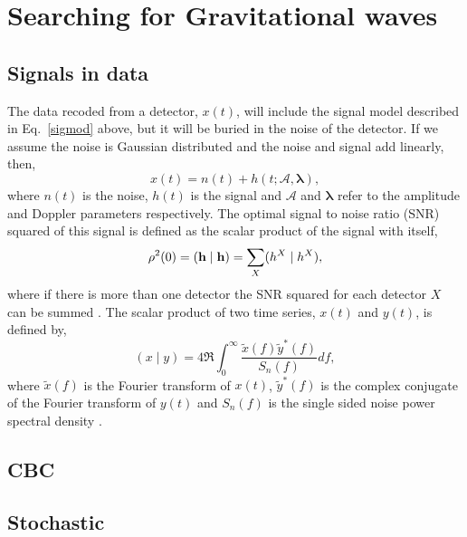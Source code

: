 \section{Searching for Gravitational waves}

\subsection{Signals in data}

The data recoded from a detector, $x(t)$, will include the signal model described in Eq.~\ref{sigmod} above, but it will be buried in the noise of the detector. 
If we assume the noise is Gaussian distributed and the noise and signal add linearly, then,  
\begin{equation}
\label{signalinnoise}
x(t) = n(t) + h(t; \mathcal{A},{\boldsymbol \lambda}) ,
\end{equation}
where $n(t)$ is the noise, $h(t)$ is the signal and $\mathcal{A}$ and ${\boldsymbol \lambda}$ refer to the amplitude and Doppler parameters respectively. 
The optimal signal to noise ratio (SNR) squared of this signal is defined as the scalar product of the signal with itself,
\begin{equation}
\rho^2(0) = ({\bf h} \mid {\bf h}) = \sum_X(h^X \mid h^X),
\end{equation}
where if there is more than one detector the SNR squared for each detector $X$ can be summed \cite{Prix2007}. 
The scalar product of two time series, $x(t)$ and $y(t)$, is defined by,
\begin{equation}
\label{snr:eq}
(x \mid y) = 4 \Re \int_{0}^{\infty} \frac{\tilde{x}(f)\tilde{y}^{*}(f)}{S_n(f)}df,
\end{equation}
where $\tilde{x}(f)$ is the Fourier transform of $x(t)$, $\tilde{y}^{*}(f)$ is the complex conjugate of the Fourier transform of $y(t)$ and $S_n(f)$ is the single sided noise power spectral density \cite{Prix2007}.

\subsection{CBC}

\subsection{Stochastic}

